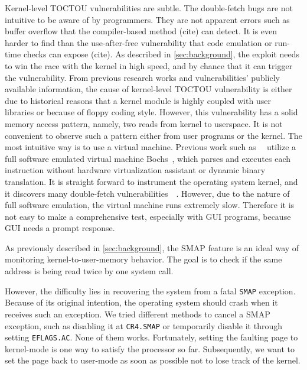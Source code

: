 Kernel-level TOCTOU vulnerabilities are subtle. The double-fetch bugs are not intuitive to be aware of by programmers. They are not apparent errors such as buffer overflow that the compiler-based method (cite) can detect. It is even harder to find than the use-after-free vulnerability that code emulation or run-time checks can expose (cite). As described in \autoref{sec:background}, the exploit needs to win the race with the kernel in high speed, and by chance that it can trigger the vulnerability. From previous research works and vulnerabilities' publicly available information, the cause of kernel-level TOCTOU vulnerability is either due to historical reasons that a kernel module is highly coupled with user libraries or because of floppy coding style. However, this vulnerability has a solid memory access pattern, namely, two reads from kernel to userspace. It is not convenient to observe such a pattern either from user programs or the kernel. The most intuitive way is to use a virtual machine. Previous work such as~\cite{jurczyk2013identifying}~\cite{bochspwnreloaded} utilize a full software emulated virtual machine Bochs~\cite{lawton2003bochs}, which parses and executes each instruction without hardware virtualization assistant or dynamic binary translation.  It is straight forward to instrument the operating system kernel, and it discovers many double-fetch vulnerabilities~\cite{jurczyk2013identifying}~\cite{bochspwnreloaded}. However, due to the nature of full software emulation, the virtual machine runs extremely slow. Therefore it is not easy to make a comprehensive test, especially with GUI programs, because GUI needs a prompt response.

As previously described in \autoref{sec:background}, the SMAP feature is an ideal way of monitoring kernel-to-user-memory behavior. The goal is to check if the same address is being read twice by one system call. 

However, the difficulty lies in recovering the system from a fatal \texttt{SMAP} exception.  Because of its original intention, the operating system should crash when it receives such an exception. We tried different methods to cancel a SMAP exception, such as disabling it at \texttt{CR4.SMAP} or temporarily disable it through setting \texttt{EFLAGS.AC}. None of them works.  Fortunately, setting the faulting page to kernel-mode is one way to satisfy the processor so far. Subsequently, we want to set the page back to user-mode as soon as possible not to lose track of the kernel.

